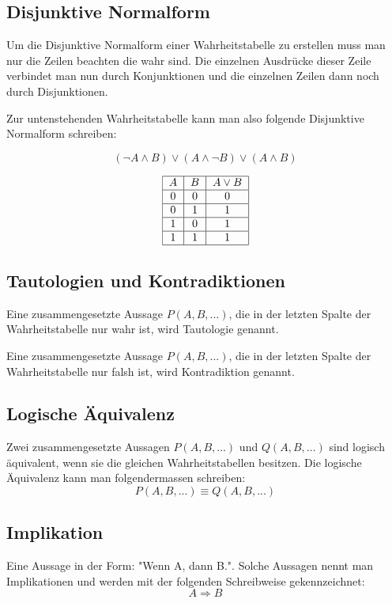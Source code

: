 \documentclass[12pt, a4paper, oneside]{article}
\begin{document}
\newpage
\subsection{Disjunktive Normalform}
Um die Disjunktive Normalform einer Wahrheitstabelle zu erstellen muss man nur die Zeilen beachten die wahr sind. Die einzelnen Ausdrücke dieser Zeile verbindet man nun durch Konjunktionen und die einzelnen Zeilen dann noch durch Disjunktionen. 

Zur untenstehenden Wahrheitstabelle kann man also folgende Disjunktive Normalform schreiben:

\begin{equation*}
  (\lnot A \land B) \lor (A \land \lnot B) \lor (A \land B)
\end{equation*}

\begin{equation*}
  \begin{tabular}{|c|c|c|}
  \hline
  $A$ & $B$ & $A \lor B$ \\ \hline
  0 & 0 & 0 \\ \hline
  0 & 1 & 1 \\ \hline
  1 & 0 & 1 \\ \hline
  1 & 1 & 1 \\ \hline
  \end{tabular}
\end{equation*} 

\subsection{Tautologien und Kontradiktionen}
Eine zusammengesetzte Aussage $P(A, B,...)$, die in der letzten Spalte der Wahrheitstabelle nur wahr ist, wird Tautologie genannt.

Eine zusammengesetzte Aussage $P(A, B,...)$, die in der letzten Spalte der Wahrheitstabelle nur falsh ist, wird Kontradiktion genannt.

\subsection{Logische Äquivalenz}
Zwei zusammengesetzte Aussagen $P(A, B,...)$ und $Q(A, B,...)$ sind logisch äquivalent, wenn sie die gleichen Wahrheitstabellen besitzen. Die logische Äquivalenz kann man folgendermassen schreiben:
\begin{equation*} 
  P(A, B,...) \equiv Q(A, B,...)
\end{equation*}

\subsection{Implikation}
Eine Aussage in der Form: "Wenn A, dann B.". Solche Aussagen nennt man Implikationen und werden mit der folgenden Schreibweise gekennzeichnet:
\begin{equation*}
  A \Rightarrow B 
\end{equation*} 
\end{document}
